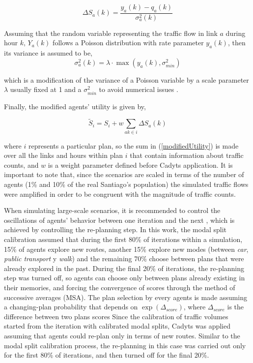 \documentclass[Journal,letterpaper]{ascelike-new}
\begin{document}
\begin{equation}
\Delta S_{a}(k)=\frac{y_{a}(k)-q_{a}(k)}{\sigma^2_{a}(k)}
\end{equation}


Assuming that the random variable representing the traffic flow in link $a$ during hour $k$, $Y_{a}(k)$ follows a Poisson distribution with rate parameter $y_{a}(k)$, then its variance is assumed to be,
\begin{equation}
\label{modifiedVariance}
\sigma_{a}^2(k)=\lambda\cdot \max(y_{a}(k), \sigma^2_{min})
\end{equation}

which is a modification of the variance of a Poisson variable by a scale parameter $\lambda$ usually fixed at 1 and a $\sigma^2_{min}$ to avoid numerical issues \citep{flotterod2011bayesian}.

Finally, the modified agents' utility is given by,

\begin{equation}
\label{modifiedUtility}
\tilde{S}_{\mathit{i}}=S_{\mathit{i}}+w\sum_{ak\in \mathit{i}}\Delta S_{a}(k)
\end{equation}

where $i$ represents a particular plan, so the sum in (\ref{modifiedUtility}) is made over all the links and hours within plan $i$ that contain information about traffic counts, and $w$ is a weight parameter defined before Cadyts application. It is important to note that, since the scenarios are scaled in terms of the number of agents (1\% and 10\% of the real Santiago's population) the simulated traffic flows were amplified in order to be congruent with the magnitude of traffic counts.

When simulating large-scale scenarios, it is recommended to control the oscillations of agents' behavior between one iteration and the next \citep{MATSimSantiago}, which is achieved by controlling the re-planning step. In this work, the modal split calibration assumed that during the first 80\% of iterations within a simulation, 15\% of agents explore new routes, another 15\% explore new modes (between \emph{car}, \emph{public transport} y \emph{walk}) and the remaining 70\% choose between plans that were already explored in the past. During the final 20\% of iterations, the re-planning step was turned off, so agents can choose only between plans already existing in their memories, and forcing the convergence of scores through the method of successive averages (MSA). The plan selection by every agents is made assuming a changing-plan probability that depends on $\exp(\Delta_{score})$, where $\Delta_{score}$ is the difference between two plans scores \citep{ConfiguringMATSim}
Since the calibration of traffic volumes started from the iteration with calibrated modal splits, Cadyts was applied assuming that agents could re-plan only in terms of new routes. Similar to the modal split calibration process, the re-planning in this case was carried out only for the first 80\% of iterations, and then turned off for the final 20\%.
\end{document}
